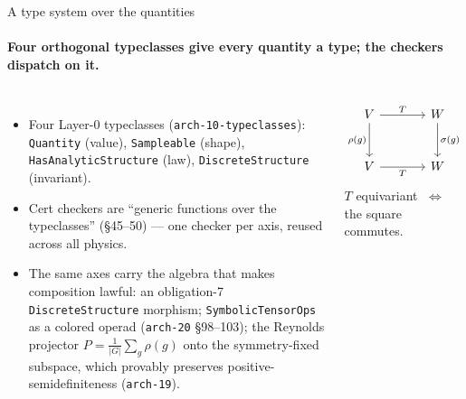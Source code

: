 \documentclass[aspectratio=169,10pt]{beamer}
\newcommand{\code}[1]{\texttt{#1}}
\newcommand{\cz}[1]{({\scriptsize\color{gray}#1})}     %
\begin{document}
\begin{frame}{A type system over the quantities}
  \framesubtitle{Four orthogonal typeclasses give every quantity a type; the checkers dispatch on it.}
  \begin{columns}[T]
    \begin{itemize}\small
      \item Four Layer-0 typeclasses \cz{\code{arch-10-typeclasses}}:
        \code{Quantity} (value), \code{Sampleable} (shape), \code{HasAnalyticStructure} (law),
        \code{DiscreteStructure} (invariant).
      \item Cert checkers are ``generic functions over the typeclasses'' \cz{\S45--50} --- one
        checker per axis, reused across all physics.
      \item The same axes carry the algebra that makes composition lawful: an obligation-7
        \code{DiscreteStructure} morphism; \code{SymbolicTensorOps} as a colored operad
        \cz{\code{arch-20} \S98--103}; the Reynolds projector
        $P=\tfrac{1}{|G|}\sum_g \rho(g)$ onto the symmetry-fixed subspace, which provably
        preserves positive-semidefiniteness \cz{\code{arch-19}}.
    \end{itemize}
    \begin{center}
    \[
      \begin{tikzcd}[ampersand replacement=\&, row sep=large, column sep=large]
        V \arrow[r, "T"] \arrow[d, "\rho(g)"'] \& W \arrow[d, "\sigma(g)"]\\
        V \arrow[r, "T"'] \& W
      \end{tikzcd}
    \]
    {\footnotesize $T$ equivariant $\;\Leftrightarrow\;$ the square commutes.}
    \end{center}
  \end{columns}
\end{frame}
\end{document}
